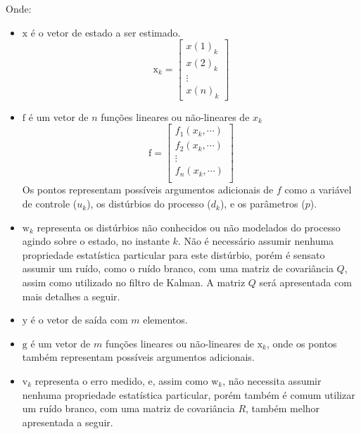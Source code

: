\noindent
Onde: 
\begin{itemize}
	\item $\mathrm{x}$ é o vetor de estado a ser estimado.
		\begin{equation}
			\mathrm{x}_k =
			\begin{bmatrix}
				x(1)_{k} \\
				x(2)_{k} \\
				\vdots \\
				x(n)_{k}
			\end{bmatrix}
		\end{equation}
		
	\item $\mathrm{f}$ é um vetor de $n$ funções lineares ou não-lineares de $x_k$
		\begin{equation}
			\mathrm{f} =
			\begin{bmatrix}
				f_1(x_k, \cdots) \\
				f_2(x_k, \cdots) \\
				\vdots \\
				f_n(x_k, \cdots) \\
			\end{bmatrix}
		\end{equation}
		Os pontos representam possíveis argumentos adicionais de $f$ como a variável de
		controle ($u_k$), os distúrbios do processo ($d_k$), e os parâmetros ($p$).
		
	\item $\mathrm{w}_k$ representa os distúrbios não conhecidos ou não modelados do processo
			agindo sobre o estado, no instante $k$. Não é necessário assumir nenhuma propriedade
			estatística particular para este distúrbio, porém é sensato assumir um ruído, como o
			ruído branco, com uma matriz de covariância $Q$, assim como utilizado no filtro de
			Kalman. A matriz $Q$ será apresentada com mais detalhes a seguir.
	
	\item $\mathrm{y}$ é o vetor de saída com $m$ elementos.
	
	\item $\mathrm{g}$ é um vetor de $m$ funções lineares ou não-lineares de $\mathrm{x}_k$, onde os pontos
			também representam possíveis argumentos adicionais.

	\item $\mathrm{v}_k$ representa o erro medido, e, assim como $\mathrm{w}_k$, não necessita
			assumir nenhuma propriedade estatística particular, porém também é comum utilizar
			um ruído branco, com uma matriz de covariância $R$, também melhor apresentada a
			seguir.
	
\end{itemize}


